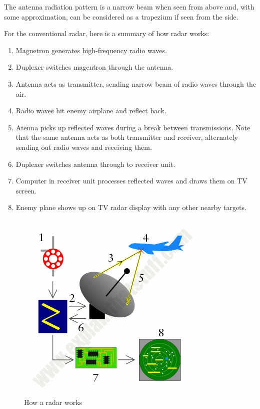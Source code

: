 \documentclass[a4paper,13pt]{report}
\begin{document}
                    \vspace{1mm}
                    \par The antenna radiation pattern is a narrow beam when seen from above and, with some 
                    approximation, can be considered as a trapezium if seen from the side. \\
                    \vspace{1mm}
                    \par For the conventional radar, here is a summary of how radar works:
                        \begin{enumerate}
                            \item Magnetron generates high-frequency radio waves.
                            \item Duplexer switches magentron through the antenna.
                            \item Antenna acts as transmitter, sending narrow beam of radio waves through the air.
                            \item Radio waves hit enemy airplane and reflect back.
                            \item Atenna picks up reflected waves during a break between transmissions. Note that the same antenna 
                            acts as both transmitter and receiver, alternately sending out radio waves and receiving them.
                            \item Duplexer switches antenna through to receiver unit.
                            \item Computer in receiver unit processes reflected waves and draws them on TV screen.
                            \item Enemy plane shows up on TV radar display with any other nearby targets. 
                        \end{enumerate}
                        \begin{figure}[H]
                            \centering
                            \includegraphics[width=0.8\linewidth]{radar-work.png}
                            \caption{\label{fig:pic}How a radar works}
                        \end{figure}
\end{document}
